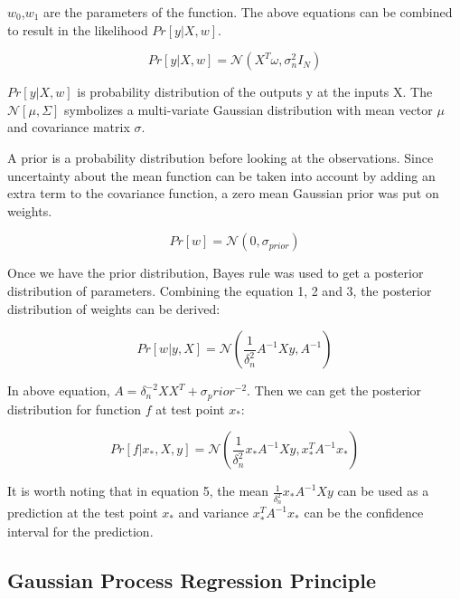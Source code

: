 \documentclass[conference]{IEEEtran}
\begin{document}
$w_0$,$w_1$ are the parameters of the function. The above equations can be combined to result in the likelihood $Pr[y|X,w]$.

\begin{equation}
  Pr[y|X,w]={\mathcal N} ( X^T \omega , \sigma_n^2 I_N )
\end{equation}

$Pr[y | X , w]$ is probability distribution of the outputs y at the inputs X. The ${\mathcal N} [\mu, \Sigma ] $ symbolizes a multi-variate Gaussian distribution with mean vector $\mu$ and covariance matrix $\sigma$. 

A prior is a probability distribution before looking at the observations. Since uncertainty about the mean function can be taken into account by adding an extra term to the covariance function, a zero mean Gaussian prior was put on weights.

\begin{equation}
  Pr[w]={\mathcal N} (0, \sigma_{prior})
\end{equation}

Once we have the prior distribution, Bayes rule was used to get a posterior distribution of parameters. Combining the equation 1, 2 and 3, the posterior distribution of weights can be derived:

\begin{equation}
  Pr[w|y,X]={\mathcal N} (\frac{1}{\delta_n^2}A^{-1}Xy , A^{-1})     
\end{equation}

In above equation, $A=\delta_n^{-2}XX^T+\sigma_prior^{-2}$. Then we can get the posterior distribution for function $f$ at test point $x_*$:

\begin{equation}
  Pr[f|x_*,X,y]={\mathcal N} (\frac{1}{\delta_n^2}x_* A^{-1}Xy , x_*^T A^{-1}x_*)     
\end{equation}

It is worth noting that in equation 5, the mean $\frac{1}{\delta_n^2}x_* A^{-1}Xy$ can be used as a prediction at the test point $x_*$ and variance $x_*^T A^{-1}x_*$ can be the confidence interval for the prediction\cite{mackay2003information}. 

\subsection{Gaussian Process Regression Principle}
\end{document}
